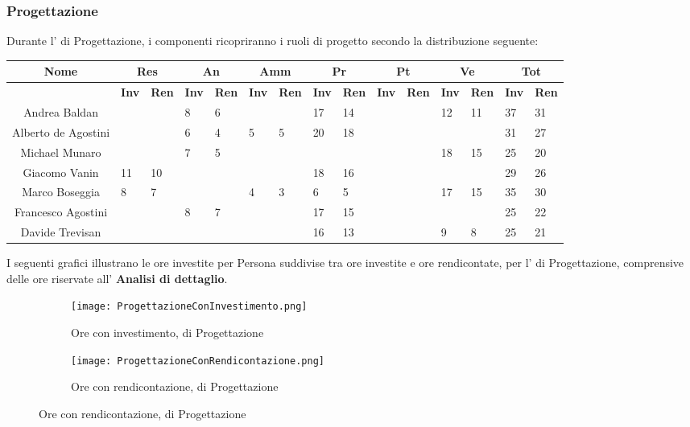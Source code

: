 \documentclass{scalatekids-article}
\begin{document}
\subsubsection{Progettazione}
Durante l' di Progettazione, i componenti ricopriranno i ruoli di progetto secondo la distribuzione seguente:
\begin{center}
  \scriptsize
  \begin{tabular}{| c | p{0.35cm}  p{0.35cm} | p{0.35cm}  p{0.35cm} | p{0.35cm}  p{0.35cm} | p{0.35cm}  p{0.35cm} | p{0.35cm}  p{0.35cm} | p{0.35cm}  p{0.35cm} | p{0.35cm}  p{0.35cm} |}
    \hline
    \textbf{Nome} & \multicolumn{2}{|c|}{\textbf{Res}} & \multicolumn{2}{|c|}{\textbf{An}} & \multicolumn{2}{|c|}{\textbf{Amm}} & \multicolumn{2}{|c|}{\textbf{Pr}} & \multicolumn{2}{|c|}{\textbf{Pt}} & \multicolumn{2}{|c|}{\textbf{Ve}} & \multicolumn{2}{|c|}{\textbf{Tot}}\\
    \hline
    & \textbf{Inv} & \textbf{Ren} & \textbf{Inv} & \textbf{Ren} & \textbf{Inv} & \textbf{Ren} & \textbf{Inv} & \textbf{Ren} & \textbf{Inv} & \textbf{Ren} & \textbf{Inv} & \textbf{Ren} & \textbf{Inv} & \textbf{Ren}\\
    \hline
    Andrea Baldan & & & 8 & 6 & & & 17 & 14 & & & 12 & 11 & 37 & 31\\
    Alberto de Agostini & & & 6 & 4 & 5 & 5 & 20 & 18 & & & & & 31 & 27\\
    Michael Munaro & & & 7 & 5 & & & & & & & 18 & 15 & 25 & 20\\
    Giacomo Vanin & 11 & 10 & & & & & 18 & 16 & & & & & 29 & 26\\
    Marco Boseggia & 8 & 7 & & & 4 & 3 & 6 & 5 & & & 17 & 15 & 35 & 30\\
    Francesco Agostini & & & 8 & 7 & & & 17 & 15 & & & & & 25 & 22\\
    Davide Trevisan & & & & & & & 16 & 13 & & & 9 & 8 & 25 & 21\\
    \hline
  \end{tabular}
\end{center}
I seguenti grafici illustrano le ore investite per Persona suddivise tra ore
investite e ore rendicontate, per l' di Progettazione, comprensive delle
ore riservate all' \textbf{Analisi di dettaglio}.
\begin{figure}[H]
  \begin{subfigure}[H]{0.47\textwidth}
    \texttt{[image: ProgettazioneConInvestimento.png]}
    \caption{Ore con investimento,  di Progettazione}
  \end{subfigure}
  \qquad
  \begin{subfigure}[H]{0.47\textwidth}
    \texttt{[image: ProgettazioneConRendicontazione.png]}
    \caption{Ore con rendicontazione,  di Progettazione}
  \end{subfigure}
\end{figure}
\end{document}
